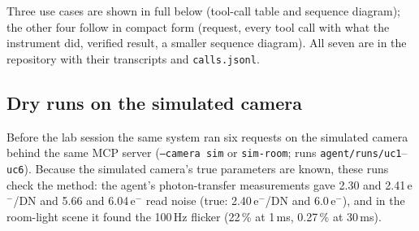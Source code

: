 \documentclass[11pt,a4paper]{article}
\begin{document}
Three use cases are shown in full below (tool-call table and sequence diagram); the other four follow in compact form
(request, every tool call with what the instrument did, verified result, a smaller sequence diagram). All seven are in
the repository with their
transcripts and \texttt{calls.jsonl}.

\clearpage

\clearpage

\clearpage

\clearpage





\subsection*{Dry runs on the simulated camera}
Before the lab session the same system ran six requests on the simulated camera behind the same MCP server
(\texttt{--camera sim} or \texttt{sim-room}; runs \texttt{agent/runs/uc1}--\texttt{uc6}). Because the simulated camera's
true parameters are known, these runs check the method: the agent's photon-transfer measurements gave 2.30 and
2.41\,e$^-$/DN and 5.66 and 6.04\,e$^-$ read noise (true: 2.40\,e$^-$/DN and 6.0\,e$^-$), and in the room-light scene it
found the 100\,Hz flicker (22\,\% at 1\,ms, 0.27\,\% at 30\,ms).
\clearpage

\end{document}
